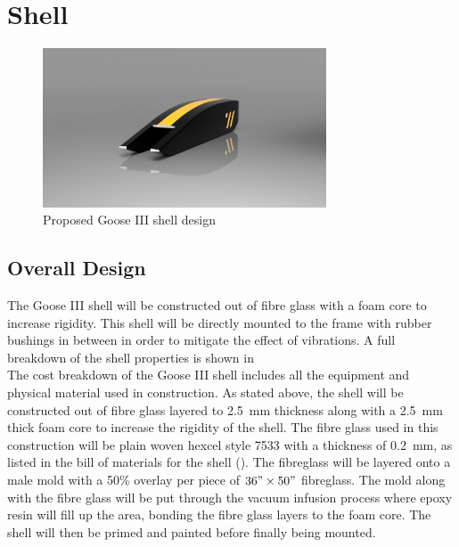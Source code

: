 \documentclass[main.tex]{subfiles}
\begin{document}
\section{Shell}
\begin{figure}[H]
  \centering
  \includegraphics[width=0.75\textwidth]{images/BTTF_Render1.png}
  \caption{Proposed Goose III shell design}
  \label{fig:shell1}
\end{figure}

    \subsection{Overall Design}
    The Goose III shell will be constructed out of fibre glass with a foam core to increase rigidity. This shell will be directly mounted to the frame with rubber bushings in between in order to mitigate the effect of vibrations. A full breakdown of the shell properties is shown in  \\
    
   	The cost breakdown of the Goose III shell includes all the equipment and physical material used in construction. As stated above, the shell will be constructed out of fibre glass layered to \SI{2.5}{mm} thickness along with a \SI{2.5}{mm} thick foam core to increase the rigidity of the shell. The fibre glass used in this construction will be plain woven hexcel style 7533 with a thickness of \SI{0.2}{mm}, as listed in the bill of materials for the shell (). The fibreglass will be layered onto a male mold with a 50\% overlay per piece of $36"\times 50"$ fibreglass. The mold along with the fibre glass will be put through the vacuum infusion process where epoxy resin will fill up the area, bonding the fibre glass layers to the foam core. The shell will then be primed and painted before finally being mounted. 
    
\end{document}
